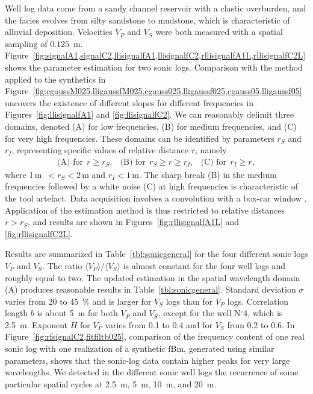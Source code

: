 Well log data come from a sandy channel reservoir with a clastic overburden,
and the facies evolves from silty sandstone to mudstone,
which is characteristic of alluvial deposition.
Velocities $V_P$ and $V_S$ were both measured with a spatial sampling of $0.125$~m. 
Figure~\ref{fig:signalA1,signalC2,llisignalfA1,llisignalfC2,rllisignalfA1L,rllisignalfC2L} shows
the parameter estimation for two sonic logs.
Comparison with the method applied to the synthetics in 
Figure~\ref{fig:cgaussM025,lligaussfM025,cgauss025,lligaussf025,cgauss05,lligaussf05}
uncovers the existence of different slopes for different frequencies in Figures~\ref{fig:llisignalfA1} and \ref{fig:llisignalfC2}.
We can reasonably delimit three domains, denoted (A) for low frequencies, (B) for medium frequencies, and (C) for very high frequencies.
These domains can be identified by parameters $r_{S}$ 
and $r_{I}$, representing specific values of relative distance $r$, namely
\begin{eqnarray}
\mbox{(A) for}\ \ r\geq r_{S}, & \mbox{(B) for}\ \ r_{S}\geq r\geq r_{I}, & \mbox{(C) for}\ \ r_{I}\geq r, \nonumber
\end{eqnarray}
where 1\,m~$<r_{S}<2$\,m and $r_{I}<1$\,m.
The sharp break (B) in the medium frequencies
followed by a white noise (C) at high frequencies is characteristic of the tool artefact.
Data acquisition involves a convolution 
with a box-car window \cite[]{Shiomi_SO97,Dolan_BR98}.
Application of the estimation method is thus restricted to relative distances $r>r_S$,
and results are shown in Figures~\ref{fig:rllisignalfA1L} and \ref{fig:rllisignalfC2L}.

Results are summarized in Table~\ref{tbl:sonicgeneral} 
for the four different sonic logs $V_P$ and $V_S$.
The ratio $\langle V_P \rangle / \langle V_S \rangle$ is almost constant
for the four well logs and roughly equal to two.
The updated estimation in the spatial wavelength domain (A) produces reasonable results in Table~\ref{tbl:sonicgeneral}.
Standard deviation $\sigma$ varies from 20 to 45~\% 
and is larger for $V_S$ logs than for $V_P$ logs.
Correlation length $b$ is about 5~m for both $V_P$ and $V_S$,
except for the well N$^{\circ}$4, which is 2.5~m.
Exponent $H$ for $V_P$ varies from 0.1 to 0.4
and for $V_S$ from 0.2 to 0.6.
In Figure~\ref{fig:rfsignalC2,fitfiltb025},
comparison of the frequency content of one real sonic log
with one realization of a synthetic fBm, generated using similar parameters, shows that
the sonic-log data contain higher peaks for very large wavelengths.
We detected in the different sonic well logs the recurrence of some particular spatial cycles 
at 2.5~m, 5~m, 10~m, and 20~m.


